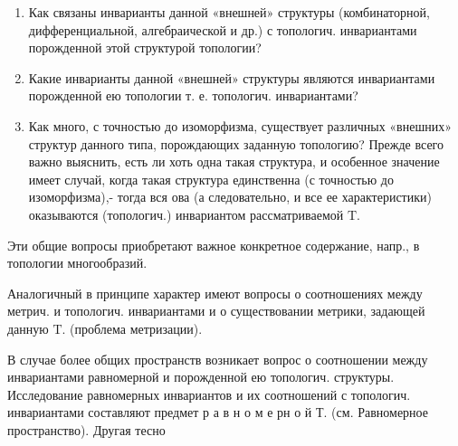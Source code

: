 \documentclass[10pt]{article}
\begin{document}
\begin{enumerate}

  \item Как связаны инварианты данной «внешней» структуры (комбинаторной, дифференциальной, алгебраической и др.) с топологич. инвариантами порожденной этой структурой топологии?



  \item Какие инварианты данной «внешней» структуры являются инвариантами порожденной ею топологии т. е. топологич. инвариантами?



  \item Как много, с точностью до изоморфизма, существует различных «внешних» структур данного типа, порождающих заданную топологию? Прежде всего важно выяснить, есть ли хоть одна такая структура, и особенное значение имеет случай, когда такая структура единственна (с точностью до изоморфизма),- тогда вся ова (а следовательно, и все ее характеристики) оказываются (топологич.) инвариантом рассматриваемой $\mathrm{T}$.



\end{enumerate}



Эти общие вопросы приобретают важное конкретное содержание, напр., в топологии многообразий.



Аналогичный в принципе характер имеют вопросы о соотношениях между метрич. и топологич. инвариантами и о существовании метрики, задающей данную $\mathrm{T}$. (проблема метризации).



В случае более общих пространств возникает вопрос о соотношении между инвариантами равномерной и порожденной ею топологич. структуры. Исследование равномерных инвариантов и их соотношений с топологич. инвариантами составляют предмет р а в н о м е рн о й Т. (см. Равномерное пространство). Другая тесно
\end{document}
